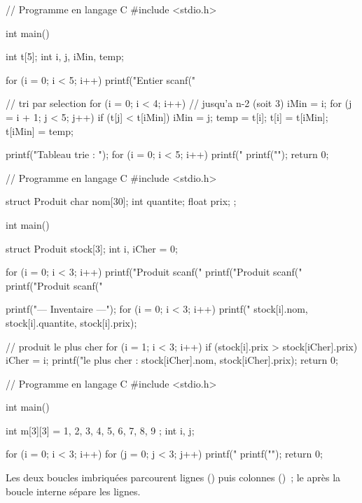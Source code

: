 \begin{codec}
// Programme en langage C
#include <stdio.h>

int main() {
    int t[5];
    int i, j, iMin, temp;

    for (i = 0; i < 5; i++) {
        printf("Entier %
        scanf("%
    }

    // tri par selection
    for (i = 0; i < 4; i++) {           // jusqu'a n-2 (soit 3)
        iMin = i;
        for (j = i + 1; j < 5; j++) {
            if (t[j] < t[iMin]) iMin = j;
        }
        temp = t[i];
        t[i] = t[iMin];
        t[iMin] = temp;
    }

    printf("Tableau trie : ");
    for (i = 0; i < 5; i++) printf("%
    printf("\n");
    return 0;
}
\end{codec}

\begin{codec}
// Programme en langage C
#include <stdio.h>

struct Produit {
    char nom[30];
    int quantite;
    float prix;
};

int main() {
    struct Produit stock[3];
    int i, iCher = 0;

    for (i = 0; i < 3; i++) {
        printf("Produit %
        scanf("%
        printf("Produit %
        scanf("%
        printf("Produit %
        scanf("%
    }

    printf("\n--- Inventaire ---\n");
    for (i = 0; i < 3; i++) {
        printf("%
               stock[i].nom, stock[i].quantite, stock[i].prix);
    }

    // produit le plus cher
    for (i = 1; i < 3; i++) {
        if (stock[i].prix > stock[iCher].prix) iCher = i;
    }
    printf("\nProduit le plus cher : %
           stock[iCher].nom, stock[iCher].prix);
    return 0;
}
\end{codec}

\begin{codec}
// Programme en langage C
#include <stdio.h>

int main() {
    int m[3][3] = { {1, 2, 3},
                    {4, 5, 6},
                    {7, 8, 9} };
    int i, j;

    for (i = 0; i < 3; i++) {
        for (j = 0; j < 3; j++) {
            printf("%
        }
        printf("\n");
    }
    return 0;
}
\end{codec}
Les deux boucles imbriquées parcourent lignes () puis colonnes ()~;
le \code{\\n} après la boucle interne sépare les lignes.

